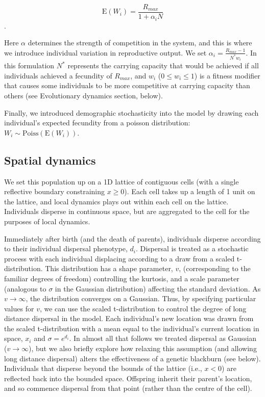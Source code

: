 \documentclass{article}
\begin{document}
\[ \text{E}(W_i)=\frac{R_{max}}{1+\alpha_i N}\].

Here \(\alpha\) determines the strength of competition in the system,
and this is where we introduce individual variation in reproductive
output. We set \(\alpha_i=\frac{R_{max}-1}{N^* w_i}\). In this
formulation \(N^*\) represents the carrying capacity that would be
achieved if all individuals achieved a fecundity of \(R_{max}\), and
\(w_i\) (\(0\leq w_i \leq 1\)) is a fitness modifier that causes some
individuals to be more competitive at carrying capacity than others (see
Evolutionary dynamics section, below).

Finally, we introduced demographic stochasticity into the model by
drawing each individual's expected fecundity from a poisson
distribution: \(W_i\sim\text{Poiss}(\text{E}(W_i))\).

\subsection{Spatial dynamics}

We set this population up on a 1D lattice of contiguous cells (with a
single reflective boundary constraining \(x\geq 0\)). Each cell takes up
a length of 1 unit on the lattice, and local dynamics plays out within
each cell on the lattice. Individuals disperse in continuous space, but
are aggregated to the cell for the purposes of local dynamics.

Immediately after birth (and the death of parents), individuals disperse
according to their individual dispersal phenotype, \(d_i\). Dispersal is
treated as a stochastic process with each individual displacing
according to a draw from a scaled t-distribution.  This distribution has a shape parameter, $v$, (corresponding to the familiar degrees of freedom) controlling the kurtosis, and a scale parameter (analogous to $\sigma$ in the Gaussian distribution) affecting the standard deviation.  As $v \rightarrow \infty$, the distribution converges on a Gaussian.  Thus, by specifying particular values for $v$, we can use the scaled t-distribution to control the degree of long distance dispersal in the model.  Each individual's new location was drawn from the scaled t-distribution with a mean equal to the
individual's current location in space, \(x_i\) and $\sigma=e^{d_i}$.   In almost all that follows we treated dispersal as Gaussian ($v \rightarrow \infty$), but we also briefly explore how relaxing this assumption (and allowing long distance dispersal) alters the effectiveness of a genetic blackburn (see below).  Individuals that disperse beyond the bounds of the
lattice (i.e., \(x<0\)) are reflected back into the bounded space.
Offspring inherit their parent's location, and so commence dispersal
from that point (rather than the centre of the cell).
\end{document}
